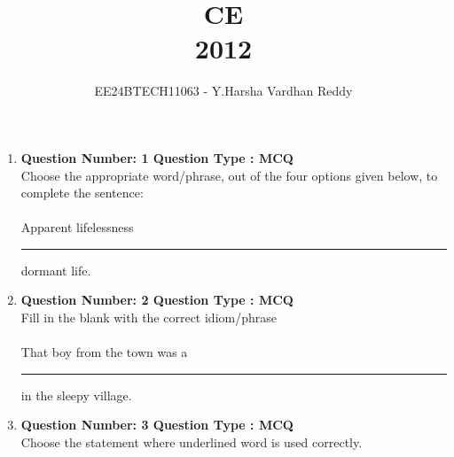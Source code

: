 \documentclass[journal]{IEEEtran}
\renewcommand{\thefigure}{\theenumi}
\renewcommand{\thetable}{\theenumi}
\numberwithin{equation}{enumi}
\numberwithin{figure}{enumi}
\begin{document}

\vspace{3cm}

\title{CE\\2012}
\author{EE24BTECH11063 - Y.Harsha Vardhan Reddy}
\maketitle
\bigskip

\renewcommand{\thefigure}{\theenumi}
\renewcommand{\thetable}{\theenumi}

\begin{enumerate}
\section*{Q.1 to Q.5 carry 1 mark each}
\item \textbf{Question Number: 1 Question Type : MCQ}\\
Choose the appropriate word/phrase, out of the four options given below, to complete the sentence:\\
\\
Apparent lifelessness \rule{1cm}{0.15mm} dormant life.
\begin{enumerate}
\end{enumerate}
\bigskip
\item \textbf{Question Number: 2 Question Type : MCQ}\\
Fill in the blank with the correct idiom/phrase\\
\\
That boy from the town was a \rule{1cm}{0.15mm} in the sleepy village.
\begin{enumerate}
\end{enumerate}
\bigskip
\item \textbf{Question Number: 3 Question Type : MCQ}\\
 Choose the statement where underlined word is used correctly. \\


\end{enumerate}
\end{document}
